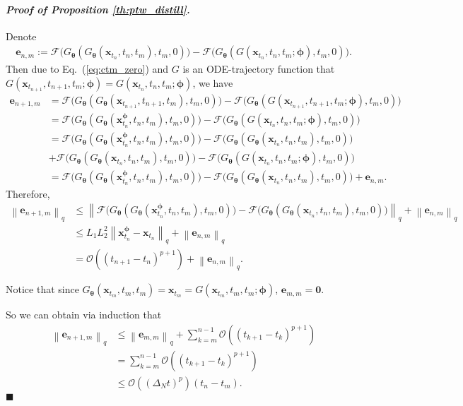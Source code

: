 \documentclass{article} \usepackage{iclr2024_coNFErence,times}
\def\eqref#1{equation~\ref{#1}}
\newcommand{\norm}[1]{\left\lVert#1\right\rVert}
\newenvironment{myproof}[2]{\paragraph{\textit{Proof of {#1} {#2}. }}}{\hfill$\blacksquare$}
\def\eqref#1{(\ref{#1})}
\def\eqref#1{(\ref{#1})}
\theoremstyle{definition}
\theoremstyle{remark}
\begin{document}
\begin{myproof}{Proposition}{\ref{th:ptw_distill}}
Denote 
\begin{align*}
    \mathbf{e}_{n,m}:= \mathcal{F}\big( G_{\bm{\theta}}(G_{\bm{\theta}}(\mathbf{x}_{t_n},t_n,t_m),t_m,0)\big) - \mathcal{F}\big( G_{\bm{\theta}}(G(\mathbf{x}_{t_{n}},t_{n},t_m; \bm{\phi}),t_m,0)  \big).
\end{align*}
Then due to Eq.~\eqref{eq:ctm_zero} and $G$ is an ODE-trajectory function that $G(\mathbf{x}_{t_{n+1}},t_{n+1},t_m; \bm{\phi})=G(\mathbf{x}_{t_{n}},t_{n},t_m; \bm{\phi})$, we have
\begin{align*}
    \mathbf{e}_{n+1,m} &= \mathcal{F}\big( G_{\bm{\theta}}(G_{\bm{\theta}}(\mathbf{x}_{t_{n+1}},t_{n+1},t_m),t_m,0)\big) - \mathcal{F}\big( G_{\bm{\theta}}(G(\mathbf{x}_{t_{n+1}},t_{n+1},t_m; \bm{\phi}),t_m,0)  \big)
    \\ &= \mathcal{F}\big( G_{\bm{\theta}}(G_{\bm{\theta}}(\mathbf{x}_{t_{n}}^{\bm{\phi}},t_{n},t_m),t_m,0)  \big) - \mathcal{F}\big( G_{\bm{\theta}}(G(\mathbf{x}_{t_{n}},t_{n},t_m; \bm{\phi}),t_m,0)  \big)
    \\ &= \mathcal{F}\big( G_{\bm{\theta}}(G_{\bm{\theta}}(\mathbf{x}_{t_{n}}^{\bm{\phi}},t_{n},t_m),t_m,0)  \big) - \mathcal{F}\big( G_{\bm{\theta}}(G_{\bm{\theta}}(\mathbf{x}_{t_n},t_n,t_m),t_m,0)\big) \\ &+ \mathcal{F}\big( G_{\bm{\theta}}(G_{\bm{\theta}}(\mathbf{x}_{t_n},t_n,t_m),t_m,0)\big) - \mathcal{F}\big( G_{\bm{\theta}}(G(\mathbf{x}_{t_{n}},t_{n},t_m; \bm{\phi}),t_m,0)  \big)
    \\ &= \mathcal{F}\big( G_{\bm{\theta}}(G_{\bm{\theta}}(\mathbf{x}_{t_{n}}^{\bm{\phi}},t_{n},t_m),t_m,0)  \big) - \mathcal{F}\big( G_{\bm{\theta}}(G_{\bm{\theta}}(\mathbf{x}_{t_n},t_n,t_m),t_m,0)\big) + \mathbf{e}_{n,m}. 
\end{align*}
Therefore, 
\begin{align*}
    \norm{\mathbf{e}_{n+1,m}}_q &\leq  \norm{\mathcal{F}\big( G_{\bm{\theta}}(G_{\bm{\theta}}(\mathbf{x}_{t_{n}}^{\bm{\phi}},t_{n},t_m),t_m,0)  \big) - \mathcal{F}\big( G_{\bm{\theta}}(G_{\bm{\theta}}(\mathbf{x}_{t_n},t_n,t_m),t_m,0)\big)}_q + \norm{\mathbf{e}_{n,m}}_q
    \\ &\leq L_1 L_2^2 \norm{\mathbf{x}_{t_{n}}^{\bm{\phi}} - \mathbf{x}_{t_n}}_q + \norm{\mathbf{e}_{n,m}}_q
    \\ &=\mathcal{O}((t_{n+1} - t_n)^{p+1})+ \norm{\mathbf{e}_{n,m}}_q. 
\end{align*}

Notice that since $G_{\bm{\theta}}(\mathbf{x}_{t_m},t_m,t_m) = \mathbf{x}_{t_m} = G(\mathbf{x}_{t_{m}},t_{m},t_m; \bm{\phi})$, $\mathbf{e}_{m,m}=\mathbf{0}$.

So we can obtain via induction that 
\begin{align*}
    \norm{\mathbf{e}_{n+1,m}}_q &\leq \norm{\mathbf{e}_{m,m}}_q + \sum_{k=m}^{n-1} \mathcal{O}((t_{k+1} - t_k)^{p+1})
    \\ &= \sum_{k=m}^{n-1} \mathcal{O}((t_{k+1} - t_k)^{p+1})
    \\ &\leq \mathcal{O}((\Delta_N t)^{p}) (t_n - t_m).
\end{align*}
\end{myproof}
\end{document}
